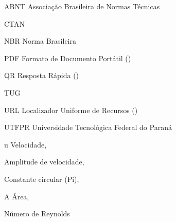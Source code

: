 
\listoffigures%

\listoftables%

\begin{AcronymsList}%
\item[ABNT] Associação Brasileira de Normas Técnicas
\item[CTAN] 
\item[NBR] Norma Brasileira
\item[PDF] Formato de Documento Portátil ()
\item[QR] Resposta Rápida ()
\item[TUG] 
\item[URL] Localizador Uniforme de Recursos ()
\item[UTFPR] Universidade Tecnológica Federal do Paraná
\end{AcronymsList}

\begin{SymbolsList}%
\item[u] Velocidade, 
\item[\beta] Amplitude de velocidade, 
\item[\pi] Constante circular (Pi), 
\item[A] Área, 
\item[\mathrm{Re}] Número de Reynolds
\end{SymbolsList}

\tableofcontents%
